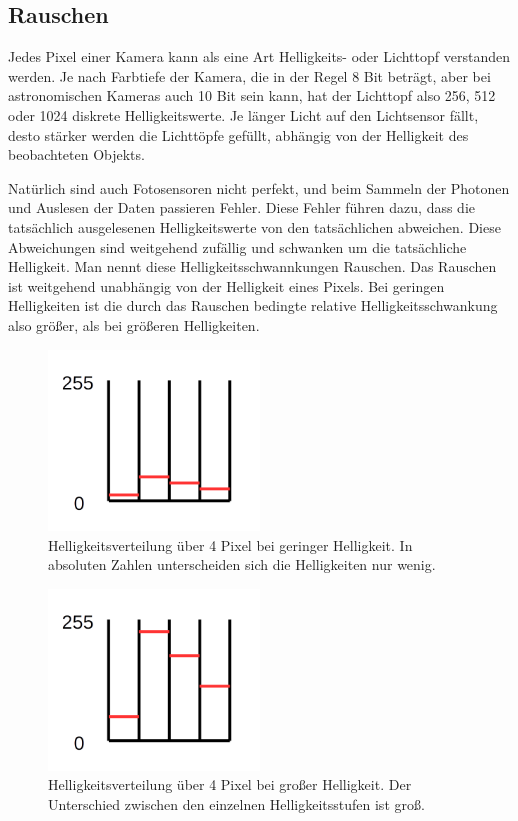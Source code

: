 \documentclass[10pt,a4paper,titlepage]{article}
\begin{document}
\subsection{Rauschen}
Jedes Pixel einer Kamera kann als eine Art Helligkeits- oder Lichttopf verstanden werden. Je nach Farbtiefe der Kamera, die in der Regel 8 Bit beträgt, aber bei astronomischen Kameras auch 10 Bit sein kann, hat der Lichttopf also 256, 512 oder 1024 diskrete Helligkeitswerte. Je länger Licht auf den Lichtsensor fällt, desto stärker werden die Lichttöpfe gefüllt, abhängig von der Helligkeit des beobachteten Objekts.

Natürlich sind auch Fotosensoren nicht perfekt, und beim Sammeln der Photonen und Auslesen der Daten passieren Fehler. Diese Fehler führen dazu, dass die tatsächlich ausgelesenen Helligkeitswerte von den tatsächlichen abweichen. Diese Abweichungen sind weitgehend zufällig und schwanken um die tatsächliche Helligkeit. Man nennt diese Helligkeitsschwannkungen Rauschen. Das Rauschen ist weitgehend unabhängig von der Helligkeit eines Pixels. Bei geringen Helligkeiten ist die durch das Rauschen bedingte relative Helligkeitsschwankung also größer, als bei größeren Helligkeiten.

\begin{figure}[h!]
  \centering
    \includegraphics[width=0.5\textwidth]{CCD_geringe_Helligkeit}
  \caption{Helligkeitsverteilung über 4 Pixel bei geringer Helligkeit. In absoluten Zahlen unterscheiden sich die Helligkeiten nur wenig.}
  \label{fig:ccd-dunkel}
\end{figure}

\begin{figure}[h!]
  \centering
    \includegraphics[width=0.5\textwidth]{CCD_ideale_Helligkeit}
  \caption{Helligkeitsverteilung über 4 Pixel bei großer Helligkeit. Der Unterschied zwischen den einzelnen Helligkeitsstufen ist groß.}
  \label{fig:ccd-hell}
\end{figure}
\end{document}

